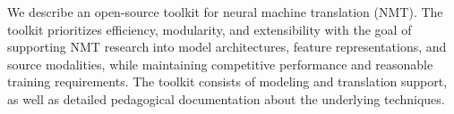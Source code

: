 We describe an open-source toolkit for neural machine translation (NMT). The toolkit prioritizes efficiency, modularity, and extensibility with the goal of supporting NMT research into model architectures, feature representations, and source modalities, while maintaining competitive performance and reasonable training requirements. The toolkit consists of modeling and translation support, as well as detailed pedagogical documentation about the underlying techniques.
